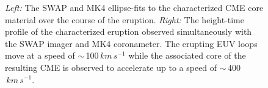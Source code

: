 \documentclass[namedreferences]{solarphysics}
\begin{document}
\begin{article}
\begin{figure}[t]
\caption{\emph{Left:} The SWAP and MK4 ellipse-fits to the characterized CME core material over the course of the eruption. \emph{Right:} The height-time profile of the characterized eruption observed simultaneously with the SWAP imager and MK4 coronameter. The erupting EUV loops move at a speed of $\sim$\,100$\,km\,s^{-1}$ while the associated core of the resulting CME is observed to accelerate up to a speed of $\sim$\,400$\,km\,s^{-1}$.}
\label{ell_heights_inner}
\end{figure}


\end{article}
\end{document}
